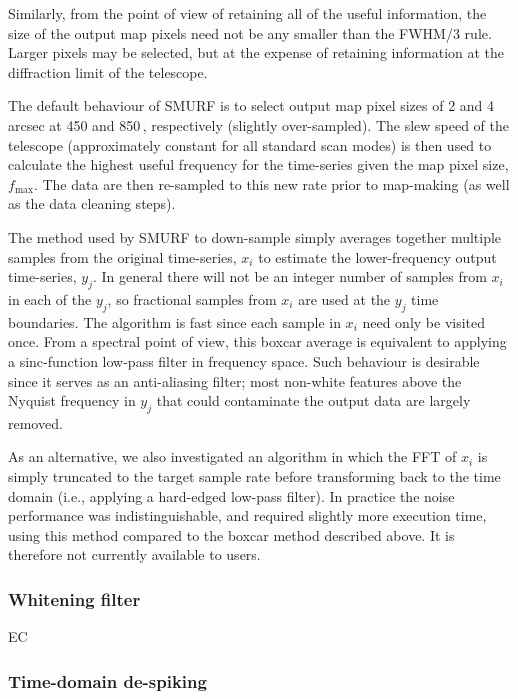 \documentclass[useAMS,usenatbib,nofootinbib]{mn2e}
\begin{document}
Similarly, from the point of view of retaining all of the useful
information, the size of the output map pixels need not be any smaller
than the FWHM/3 rule. Larger pixels may be selected, but at the
expense of retaining information at the diffraction limit of the
telescope.

The default behaviour of SMURF is to select output map pixel sizes of
2 and 4\,arcsec at 450 and 850\,\micron, respectively (slightly
over-sampled). The slew speed of the telescope (approximately constant
for all standard scan modes) is then used to calculate the highest
useful frequency for the time-series given the map pixel size,
$f_\mathrm{max}$. The data are then re-sampled to this new rate prior
to map-making (as well as the data cleaning steps).

The method used by SMURF to down-sample simply averages together
multiple samples from the original time-series, $x_i$ to estimate the
lower-frequency output time-series, $y_j$. In general there will not
be an integer number of samples from $x_i$ in each of the $y_j$, so
fractional samples from $x_i$ are used at the $y_j$ time
boundaries. The algorithm is fast since each sample in $x_i$ need only
be visited once. From a spectral point of view, this boxcar average is
equivalent to applying a sinc-function low-pass filter in frequency
space. Such behaviour is desirable since it serves as an anti-aliasing
filter; most non-white features above the Nyquist frequency in $y_j$
that could contaminate the output data are largely removed.

As an alternative, we also investigated an algorithm in which the FFT
of $x_i$ is simply truncated to the target sample rate before
transforming back to the time domain (i.e., applying a hard-edged
low-pass filter). In practice the noise performance was
indistinguishable, and required slightly more execution time, using
this method compared to the boxcar method described above. It is
therefore not currently available to users.

\subsubsection{Whitening filter}

EC

\subsubsection{Time-domain de-spiking}
\label{sec:timedespike}
\end{document}
